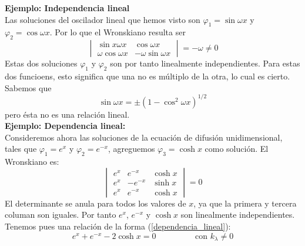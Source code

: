 \textbf{Ejemplo: Independencia lineal} 
\\
Las soluciones del oscilador lineal que hemos visto son $\varphi_{1} = \sin \omega x$ y $\varphi_{2} = \cos \omega x$. Por lo que el Wronskiano resulta ser
\[ \begin{vmatrix}
\sin x \omega x & \cos \omega x \\
\omega \cos \omega x & - \omega \sin \omega x
\end{vmatrix} = -\omega \neq 0 \]
Estas dos soluciones $\varphi_{1}$ y $\varphi_{2}$ son por tanto linealmente independientes. Para estas dos funcioens, esto significa que una no es múltiplo de la otra, lo cual es cierto.
\\
Sabemos que
\[ \sin \omega x = \pm (1 - \cos^{2} \omega x)^{1/2} \]
pero ésta no es una relación lineal.
\\
\textbf{Ejemplo: Dependencia lineal:}
\\
Consideremos ahora las soluciones de la ecuación de difusión unidimensional, tales que $\varphi_{1} = e^{x}$ y $\varphi_{2} = e^{-x}$, agreguemos $\varphi_{3} = \cosh x$ como solución. El Wronskiano es:
\[ \begin{vmatrix}
e^{x}  & e^{-x} & \cosh x \\
e^{x}  & -e^{-x} & \sinh x \\
e^{x}  & e^{-x} & \cosh x
\end{vmatrix} = 0 \]
El determinante se anula para todos los valores de $x$, ya que la primera y tercera columan son iguales. Por tanto $e^{x}$, $e^{-x}$ y $\cosh	x$ son linealmente independientes. Tenemos pues una relación de la forma (\ref{dependencia_lineal}):
\[ e^{x} + e^{-x} - 2 \cosh x = 0 \hspace{2cm} \text{con } k_{\lambda} \neq	0 \]
